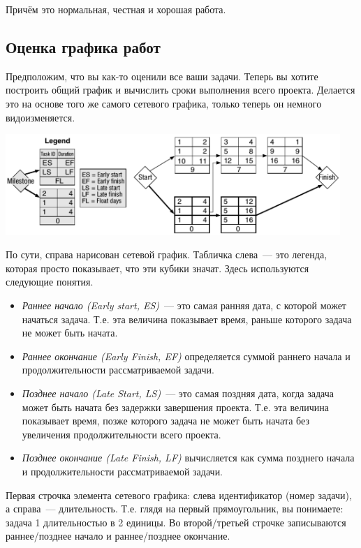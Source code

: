 \documentclass{../../text-style}
\begin{document}
Причём это нормальная, честная и хорошая работа.

\subsection{Оценка графика работ}

Предположим, что вы как-то оценили все ваши задачи. Теперь вы хотите построить общий график и вычислить сроки выполнения всего проекта. Делается это на основе того же самого сетевого графика, только теперь он немного видоизменяется.

\begin{center}
    \includegraphics[width=0.95\textwidth]{graphEstimate.png}
\end{center}

По сути, справа нарисован сетевой график. Табличка слева~--- это легенда, которая просто показывает, что эти кубики значат. Здесь используются следующие понятия.

\begin{itemize}
    \item \emph{Раннее начало (Early start, ES)}~--- это самая ранняя дата, с которой может начаться задача. Т.е. эта величина показывает время, раньше которого задача не может быть начата.
    \item \emph{Раннее окончание (Early Finish, EF)} определяется суммой раннего начала и продолжительности рассматриваемой задачи.
    \item \emph{Позднее начало (Late Start, LS)}~--- это самая поздняя дата, когда задача может быть начата без задержки завершения проекта. Т.е. эта величина показывает время, позже которого задача не может быть начата без увеличения продолжительности всего проекта.
    \item \emph{Позднее окончание (Late Finish, LF)} вычисляется как сумма позднего начала и продолжительности рассматриваемой задачи.
\end{itemize}

Первая строчка элемента сетевого графика: слева идентификатор (номер задачи), а справа~--- длительность. Т.е. глядя на первый прямоугольник, вы понимаете: задача 1 длительностью в 2 единицы. Во второй/третьей строчке записываются раннее/позднее начало и раннее/позднее окончание.
\end{document}
